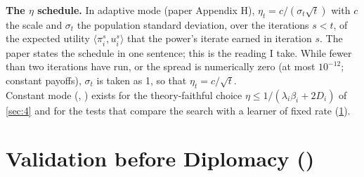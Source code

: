 \documentclass[12pt,a4paper]{article}
\begin{document}
\textbf{The $\eta$ schedule.}
In adaptive mode (paper Appendix H), $\eta_t = c / (\sigma_t \sqrt{t})$ with $c$ the scale and $\sigma_t$ the population standard deviation, over the iterations $s < t$, of the expected utility $\langle \pi_i^{s}, u_i^{s} \rangle$ that the power's iterate earned in iteration $s$.
The paper states the schedule in one sentence; this is the reading I take.
While fewer than two iterations have run, or the spread is numerically zero (at most $10^{-12}$; constant payoffs), $\sigma_t$ is taken as 1, so that $\eta_t = c / \sqrt{t}$.\\
Constant mode (, ) exists for the theory-faithful choice $\eta \le 1 / (\lambda_i \beta_i + 2 D_i)$ of \cref{sec:4} and for the tests that compare the search with a learner of fixed rate (\cref{sec:8}).

\section{Validation before Diplomacy (\texorpdfstring{}{tests/search/})}\label{sec:8}
\end{document}
